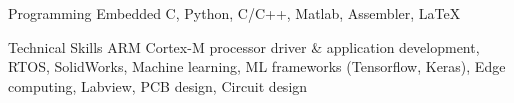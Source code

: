 

\begin{cvskills}

  \cvskill
    {Programming} %
    {Embedded C, Python, C/C++, Matlab, Assembler, \LaTeX} %

  \cvskill
    {Technical Skills} %
    {ARM Cortex-M processor driver \& application development, RTOS, SolidWorks, Machine learning, ML frameworks (Tensorflow, Keras), Edge computing, Labview, PCB design, Circuit design} %


\end{cvskills}

